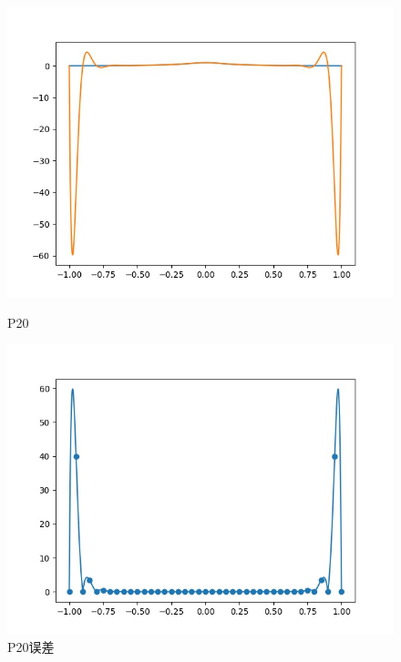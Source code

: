 \documentclass{article}
\numberwithin{equation}{section}
\numberwithin{table}{section}
\begin{document}
\begin{figure}[H]
    \begin{minipage}[t]{0.48\linewidth}
        \centering
        \includegraphics[scale=0.5]{P20.jpg}
        \caption{P20}
    \end{minipage}
    \begin{minipage}[t]{0.48\linewidth}
        \centering
        \includegraphics[scale=0.5]{P20.sub.jpg}
        \caption{P20误差}
    \end{minipage}
\end{figure}
\end{document}
